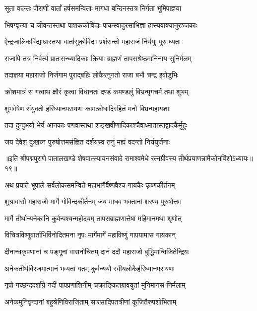 \twolineshloka
{सूता वदन्तः पौराणीं वार्तां हर्षसमन्विताः}
{मागधा बन्दिनस्तत्र निर्गता भूमिपाज्ञया}%

\twolineshloka
{भिषग्वृत्त्या च जीवन्तस्तथा पाशककोविदाः}
{पाकस्वादुरसाभिज्ञा हास्यवाक्यानुरञ्जकाः}%

\twolineshloka
{ऐन्द्रजालिकविद्याध्रास्तथा वार्तासुकोविदाः}
{प्रशंसन्तो महाराजं निर्ययुः पुरमध्यतः}%

\twolineshloka
{राजापि तत्र निर्वर्त्य प्रातःसन्ध्यादिकाः क्रियाः}
{ब्राह्मणं तापसश्रेष्ठमानिनाय सुनिर्मलम्}%

\twolineshloka
{तदाज्ञया महाराजो निर्जगाम पुराद्बहिः}
{लोकैरनुगतो राजा बभौ चन्द्र इवोडुभिः}%

\twolineshloka
{क्रोशमात्रं स गत्वाथ क्षौरं कृत्वा विधानतः}
{दण्डं कमण्डलुं बिभ्रन्मृगचर्म तथा शुभम्}%

\twolineshloka
{शुभवेषेण संयुक्तो हरिध्यानपरायणः}
{कामक्रोधादिरहितं मनो बिभ्रन्महायशाः}%

\twolineshloka
{तदा दुन्दुभयो भेर्य आनकाः पणवास्तथा}
{शङ्खवीणादिकाश्चैवाध्मातास्तद्वादकैर्मुहुः}%

\twolineshloka
{जय देवेश दुःखघ्न पुरुषोत्तमसंज्ञित}
{दर्शयस्व तनुं मह्यं वदन्तो निर्ययुर्जनाः}%

॥इति श्रीपद्मपुराणे पातालखण्डे शेषवात्स्यायनसंवादे रामाश्वमेधे रत्नग्रीवस्य तीर्थप्रयाणन्नामैकोनविंशोऽध्यायः॥१९॥



\twolineshloka
{अथ प्रयाते भूपाले सर्वलोकसमन्विते}
{महाभागैर्वैष्णवैश्च गायकैः कृष्णकीर्तनम्}%

\twolineshloka
{शुश्रावासौ महाराजो मार्गे गोविन्दकीर्तनम्}
{जय माधव भक्तानां शरण्य पुरुषोत्तम}%

\twolineshloka
{मार्गे तीर्थान्यनेकानि कुर्वन्पश्यन्महोदयम्}
{तापसब्राह्मणात्तेषां महिमानमथा शृणोत्}%

\twolineshloka
{विचित्रविष्णुवार्ताभिर्विनोदितमना नृपः}
{मार्गेमार्गे महाविष्णुं गापयामास गायकान्}%

\twolineshloka
{दीनान्धकृपणानां च पङ्गूनां वासनोचितम्}
{दानं ददौ महाराजो बुद्धिमान्विजितेन्द्रियः}%

\twolineshloka
{अनेकतीर्थविरजमात्मानं भव्यतां गतम्}
{कुर्वन्ययौ स्वीयलोकैर्हरिध्यानपरायणः}%

\twolineshloka
{नृपो गच्छन्ददर्शाग्रे नदीं पापप्रणाशिनीम्}
{चक्राङ्कितग्रावयुतां मुनिमानस निर्मलाम्}%

\twolineshloka
{अनेकमुनिवृन्दानां बहुश्रेणिविराजिताम्}
{सारसादिपतत्रीणां कूजितैरुपशोभिताम्}%

